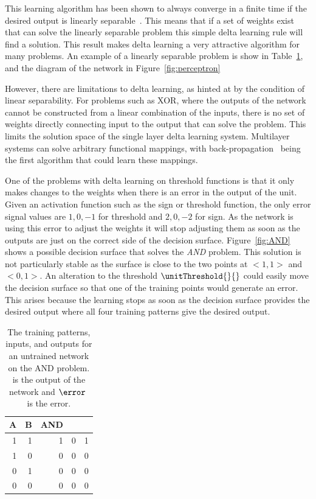 This learning algorithm has been shown to always converge in a finite time if the desired output is linearly separable~\citep{Novikoff1962}.  This means that if a set of weights exist that can solve the linearly separable problem this simple delta learning rule will find a solution. This result makes delta learning a very attractive algorithm for many problems.  An example of a linearly separable problem is show in Table~\ref{tab:AND}, and the diagram of the network in Figure~\ref{fig:perceptron}  

However, there are limitations to delta learning, as hinted at by the condition of linear separability.  For problems such as XOR, where the outputs of the network cannot be constructed from a linear combination of the inputs, there is no set of weights directly connecting input to the output that can solve the problem.  This limits the solution space of the single layer delta learning system.  Multilayer systems can solve arbitrary functional mappings, with back-propagation~\citep{Rumelhart86} being the first algorithm that could learn these mappings.

One of the problems with delta learning on threshold functions is that it only makes changes to the weights when there is an error in the output of the unit.  Given an activation function such as the sign or threshold function, the only error signal values are $1,0,-1$ for threshold and $2,0,-2$ for sign.  As the network is using this error to adjust the weights it will stop adjusting them as soon as the outputs are just on the correct side of the decision surface.  Figure~\ref{fig:AND} shows a possible decision surface that solves the \emph{AND} problem.  This solution is not particularly stable as the surface is close to the two points at $<1,1>$ and $<0,1>$.  An alteration to the threshold $\unitThreshold{}{}$ could easily move the decision surface so that one of the training points would generate an error.  This arises because the learning stops as soon as the decision surface provides the desired output where all four training patterns give the desired output. 

\begin{table}
	\centering
	\begin{tabular}{rr|r|r|r}
			A&B&AND &\unitActivation{}{}&\error\\
			\hline
			1&1&1        & 0                 & 1\\
			1&0&0        & 0                 & 0\\
			0&1&0        & 0                 & 0\\
			0&0&0        & 0                 & 0\\
	\end{tabular}
	\caption{The training patterns, inputs, and outputs for an untrained network on the AND problem. \unitActivation{}{} is the output of the network and $\error\ $ is the error.}
	\label{tab:AND}
\end{table}

